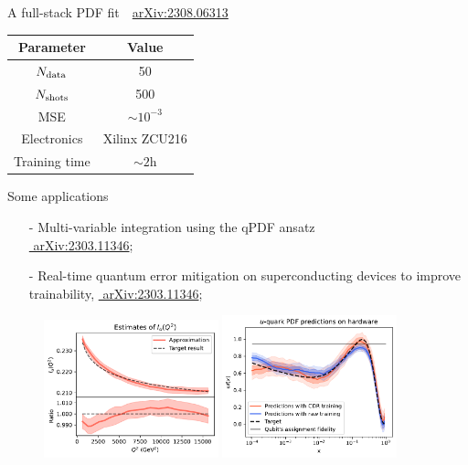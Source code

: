 \documentclass[8pt, xcolor={svgnames}, hyperref={linkcolor=black}]{beamer}
\begin{document}
\begin{frame}{A full-stack PDF fit \hfill \faBook\,\, \href{https://arxiv.org/abs/2308.06313}{arXiv:2308.06313}}
\begin{multicols}{2}
\begin{table}
\flushright
\vspace{-0.5cm}
\begin{tabular}{cc}
\hline \hline 
\textbf{Parameter} & \textbf{Value} \\
\hline 
$N_{\rm data}$ & 50 \\
$N_{\rm shots}$ & 500 \\
MSE & $\sim 10^{-3}$ \\
Electronics & Xilinx ZCU216 \\
Training time & $\sim 2$h \\
\hline \hline
\end{tabular}
\end{table}
\vspace{0.5cm}
\end{multicols}
\end{frame}

\begin{frame}{Some applications}
  \small
  \begin{itemize}
  \item[-] Multi-variable integration using the qPDF ansatz\\
  \href{https://arxiv.org/abs/2303.11346}{\faBook\,\,arXiv:2303.11346};
  \item[-] Real-time quantum error mitigation on superconducting devices to improve trainability,
  \href{https://arxiv.org/abs/2303.11346}{\faBook\,\,arXiv:2303.11346};
  \end{itemize}
    \begin{figure}
      \includegraphics[width=0.45\textwidth]{figures/uquark2d.pdf}%
      \includegraphics[width=0.45\textwidth]{figures/hardware.pdf}
    \end{figure}
\end{frame}
\end{document}

